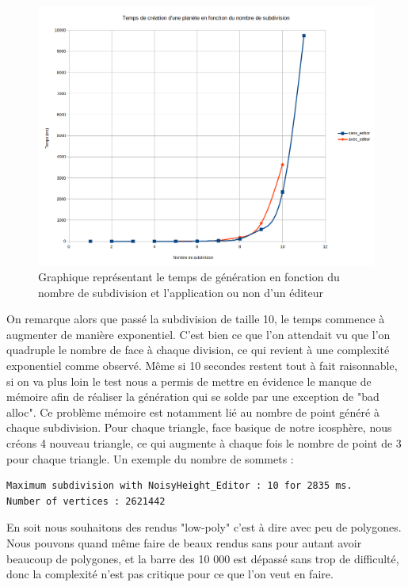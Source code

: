 \documentclass[a4paper]{article}
\begin{document}
\begin{figure}[!ht]
    \begin{center}
        \includegraphics[scale=0.4]{img/perf.png}
        \caption{Graphique représentant le temps de génération en fonction du nombre de subdivision et l'application ou non d'un éditeur}
        \label{graphperf}
    \end{center}
\end{figure}

On remarque alors que passé la subdivision de taille 10, le temps commence à augmenter de manière exponentiel. C'est bien ce que l'on attendait vu que l'on quadruple le nombre de face à chaque division, ce qui revient à une complexité exponentiel comme observé. Même si 10 secondes restent tout à fait raisonnable, si on va plus loin le test nous a permis de mettre en évidence le manque de mémoire afin de réaliser la génération qui se solde par une exception de "bad alloc". Ce problème mémoire est notamment lié au nombre de point généré à chaque subdivision. Pour chaque triangle, face basique de notre icosphère, nous créons 4 nouveau triangle, ce qui augmente à chaque fois le nombre de point de 3 pour chaque triangle.
Un exemple du nombre de sommets :
\begin{lstlisting}[caption= Résultat des tests unitaires]
Maximum subdivision with NoisyHeight_Editor : 10 for 2835 ms.
Number of vertices : 2621442
\end{lstlisting}

En soit nous souhaitons des rendus "low-poly" c'est à dire avec peu de polygones. Nous pouvons quand même faire de beaux rendus sans pour autant avoir beaucoup de polygones, et la barre des 10 000 est dépassé sans trop de difficulté, donc la complexité n'est pas critique pour ce que l'on veut en faire.
\end{document}
